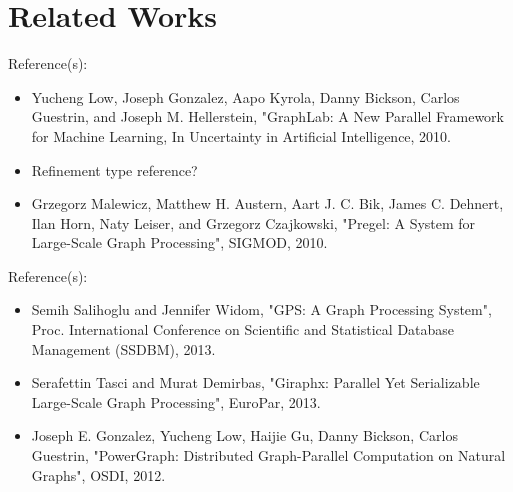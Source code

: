 \section{Related Works}

\begin{frame}{Reference(s):}
\begin{itemize}
 \item Yucheng Low, Joseph Gonzalez, Aapo Kyrola, Danny Bickson, Carlos Guestrin, and Joseph M. Hellerstein, "GraphLab: A New Parallel Framework for Machine Learning, In Uncertainty in Artificial Intelligence, 2010.
\item Refinement type reference?
\item Grzegorz Malewicz, Matthew H. Austern, Aart J. C. Bik, James C. Dehnert, Ilan Horn,
Naty Leiser, and Grzegorz Czajkowski, "Pregel: A System for Large-Scale Graph Processing", SIGMOD, 2010.
    \end{itemize}
\end{frame}


\begin{frame}{Reference(s):}
\begin{itemize}
\item Semih Salihoglu and Jennifer Widom, "GPS: A Graph Processing System", Proc. International Conference on Scientific and Statistical Database Management (SSDBM), 2013.
\item Serafettin Tasci and Murat Demirbas, "Giraphx: Parallel Yet Serializable Large-Scale Graph Processing", EuroPar, 2013. 
\item Joseph E. Gonzalez, Yucheng Low, Haijie Gu, Danny Bickson, Carlos Guestrin, "PowerGraph: Distributed Graph-Parallel Computation on Natural Graphs", OSDI, 2012.     
    \end{itemize}
\end{frame}
 
